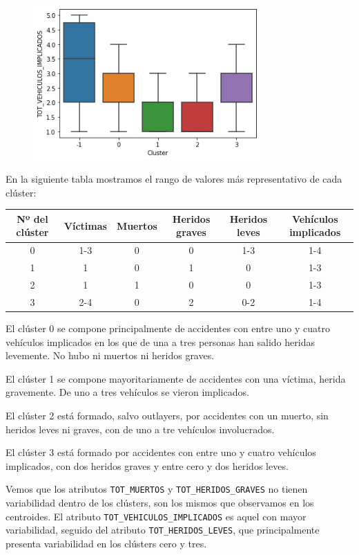 \documentclass[a4]{article}
\begin{document}
\begin{figure}[H]
  \includegraphics[width=87mm]{imagenes/c3_dbscan_vi}
\end{figure}

\newpage
En la siguiente tabla mostramos el rango de valores más representativo de cada clúster:

\begin{center}
\begin{tabular}{|c|c|c|c|c|c|}
\hline
\multicolumn{1}{|c|}{\textbf{Nº del clúster}} & \textbf{Víctimas} & \textbf{Muertos} & \textbf{Heridos graves} & \textbf{Heridos leves} & \textbf{Vehículos implicados}\\ \hline
  0  & 1-3 & 0 & 0 & 1-3 & 1-4 \\ \hline
  1  & 1   & 0 & 1 & 0   & 1-3 \\ \hline
  2  & 1   & 1 & 0 & 0   & 1-3 \\ \hline
  3  & 2-4 & 0 & 2 & 0-2 & 1-4 \\ \hline
\end{tabular}
\end{center}

El clúster 0 se compone principalmente de accidentes con entre uno y cuatro vehículos implicados en los que de una a tres personas han salido heridas levemente. No hubo ni muertos ni heridos graves.

El clúster 1 se compone mayoritariamente de accidentes con una víctima, herida gravemente. De uno a tres vehículos se vieron implicados.

El clúster 2 está formado, salvo outlayers, por accidentes con un muerto, sin heridos leves ni graves, con de uno a tre vehículos involucrados.

El clúster 3 está formado por accidentes con entre uno y cuatro vehículos implicados, con dos heridos graves y entre cero y dos heridos leves.

Vemos que los atributos \texttt{TOT\_MUERTOS} y \texttt{TOT\_HERIDOS\_GRAVES} no tienen variabilidad dentro de los clústers, son los mismos que observamos en los centroides. El atributo \texttt{TOT\_VEHICULOS\_IMPLICADOS} es aquel con mayor variabilidad, seguido del atributo \texttt{TOT\_HERIDOS\_LEVES}, que principalmente presenta variabilidad en los clústers cero y tres.
\end{document}

